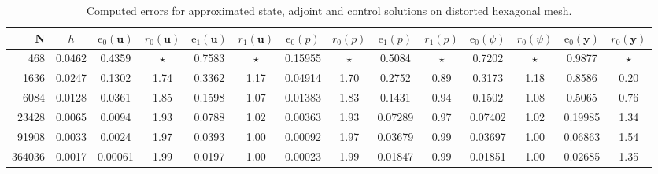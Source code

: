 \documentclass[smallextended]{svjour3}
\numberwithin{equation}{section}
\numberwithin{figure}{section}
\numberwithin{table}{section}
\newcommand\by{\boldsymbol{y}}
\newcommand\bu{\boldsymbol{u}}
\begin{document}
		\begin{table}[ht!]
			\setlength{\tabcolsep}{4.5pt}
			\centering 
			\caption{Computed errors for approximated state, adjoint and control solutions on distorted hexagonal mesh.}
			{\small
					\begin{tabular}{|rc|cccc|cccc|cc|cc|} 
					\hline\hline
					N   &   $h$  & $\mathrm{e}_0(\bu)$  &   $r_0(\bu)$   &   $\mathrm{e}_1(\bu)$  &   $r_1(\bu)$  & $\mathrm{e}_0(p)$  &   $r_0(p)$   &   $\mathrm{e}_1(p)$  &   $r_1(p)$ & $\mathrm{e}_0(\psi)$  &   $r_0(\psi)$   &   $\mathrm{e}_0(\by)$  &   $r_0(\by)$ \\
					\hline 
468 & 0.0462 & 0.4359   &  $\star$ & 0.7583  &   $\star$ & 0.15955 &   $\star$ & 0.5084 &   $\star$ & 0.7202  &   $\star$ & 0.9877 &   $\star$ \\
1636 & 0.0247 & 0.1302   &  1.74  &  0.3362  & 1.17  & 0.04914 &   1.70  &  0.2752   & 0.89 &  0.3173   & 1.18 &  0.8586  & 0.20 \\
6084 & 0.0128 & 0.0361  & 1.85 &  0.1598   &  1.07 & 0.01383 &   1.83  &  0.1431  &  0.94 &  0.1502  &  1.08 &  0.5065 &  0.76  \\
23428 & 0.0065 & 0.0094  &  1.93  &  0.0788 &  1.02 &  0.00363 & 1.93 & 0.07289  &  0.97 &  0.07402  &  1.02 &  0.19985  &  1.34 \\
91908 & 0.0033 & 0.0024 & 1.97  &  0.0393  &  1.00 & 0.00092 &  1.97 & 0.03679 &  0.99 &  0.03697 &  1.00  &  0.06863 &  1.54 \\
364036 & 0.0017 & 0.00061 & 1.99  &  0.0197  &  1.00 & 0.00023 &  1.99 & 0.01847 &  0.99 &  0.01851 &  1.00 &  0.02685 &  1.35 \\
					\hline
					\hline
			\end{tabular}}
			\smallskip			
			\label{table-Ex1}
		\end{table}
\end{document}
